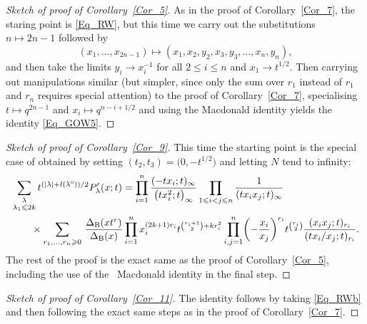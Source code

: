 \documentclass[pdftex]{sigma}
\numberwithin{equation}{section}
\renewcommand{\leq}{\leqslant}
\renewcommand{\geq}{\geqslant}
\newcommand{\odd}{\textup{o}}
\newcommand{\abs}[1]{\vert#1\vert}
\newcommand{\la}{\lambda}
\begin{document}
\begin{proof}[Sketch of proof of Corollary~\ref{Cor_5}]
As in the proof of Corollary~\ref{Cor_7}, the staring point is
\eqref{Eq_RW}, but this time we carry out the substitutions
$n\mapsto 2n-1$ followed by
\[
(x_1,\dots,x_{2n-1})\mapsto
(x_1,x_2,y_2,x_3,y_3,\dots,x_n,y_n),
\]
and then take the limits $y_i\to x_i^{-1}$ for all $2\leq i\leq n$
and $x_1\to t^{1/2}$.
Then carrying out manipulations similar (but simpler, since only the
sum over $r_1$ instead of $r_1$ and $r_n$ requires special attention)
to the proof of Corollary~\ref{Cor_7}, specialising
$t\mapsto q^{2n-1}$ and $x_i\mapsto q^{n-i+1/2}$ and using the
 Macdonald identity yields the identity \eqref{Eq_GOW5}.
\end{proof}


\begin{proof}[Sketch of proof of Corollary~\ref{Cor_9}]
This time the starting point is the special case of
\cite[Proposition~5.10]{RW21} obtained
by setting $(t_2,t_3)=\bigl(0,-t^{1/2}\bigr)$ and letting $N$ tend to infinity:
\begin{align}
&\sum_{\substack{\la \\[1pt] \la_1\leq 2k}}
t^{(\abs{\la}+l(\la^{\odd}))/2} P'_{\la}(x;t)
=\prod_{i=1}^n \frac{(-tx_i;t)_{\infty}}{\bigl(tx_i^2;t\bigr)_{\infty}}
\prod_{1\leq i<j\leq n} \frac{1}{(tx_ix_j;t)_{\infty}} \notag \\
&\qquad\times \sum_{r_1,\dots,r_n\geq 0}\,
\frac{\Delta_{\mathrm{B}}(xt^r)}{\Delta_{\mathrm{B}}(x)}
\prod_{i=1}^n x_i^{(2k+1)r_i} t^{\binom{r_i+1}{2}+kr_i^2}
\prod_{i,j=1}^n \biggl({-}\frac{x_i}{x_j}\biggr)^{r_i} t^{\binom{r_i}{2}}
\frac{(x_ix_j;t)_{r_i}}{(tx_i/x_j;t)_{r_i}} \label{Eq_RWb}.
\end{align}
The rest of the proof is the exact same as the proof of
Corollary~\ref{Cor_5}, including the use of the~
Macdonald identity in the final step.
\end{proof}

\begin{proof}[Sketch of proof of Corollary~\ref{Cor_11}]
The identity follows by taking \eqref{Eq_RWb} and then following
the exact same steps as in the proof of Corollary~\ref{Cor_7}.
\end{proof}
\end{document}
